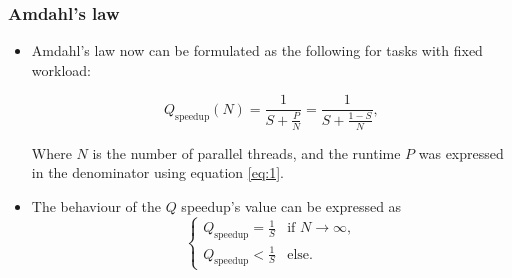 \begin{frame}
\frametitle{Amdahl's law}

\begin{itemize}
	\item<1-> Amdahl's law now can be formulated as the following for tasks with fixed workload:
	\begin{block}{}	
		\begin{equation} \label{eq:2}
			Q_{\text{speedup}} \left( N \right)
			=
			\frac{1}{S + \frac{P}{N}}
			=
			\frac{1}{S + \frac{1 - S}{N}},
		\end{equation}
	\end{block}	
	Where $N$ is the number of parallel threads, and the runtime $P$ was expressed in the denominator using equation \eqref{eq:1}.
	\item<2-> The behaviour of the $Q$ speedup's value can be expressed as
	\begin{equation}
		\begin{cases}
			Q_{\text{speedup}} = \frac{1}{S} & \text{if } N \to \infty, \\
			Q_{\text{speedup}} < \frac{1}{S} & \text{else}.
		\end{cases}
	\end{equation}
\end{itemize}

\end{frame}